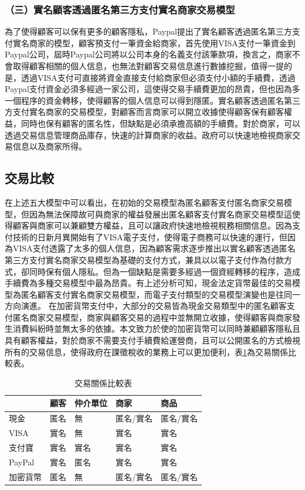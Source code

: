 		\subsubsection{（三）實名顧客透過匿名第三方支付實名商家交易模型}
		為了使得顧客可以保有更多的顧客隱私，Paypal提出了實名顧客透過匿名第三方支付實名商家的模型，顧客預支付一筆資金給商家，首先使用VISA支付一筆資金到Paypal公司，屆時Paypal公司將以公司本身的名義支付該筆款項，換言之，商家不會取得顧客相關的個人信息，也無法對顧客交易信息進行數據挖掘，值得一提的是，透過VISA支付可直接將資金直接支付給商家但必須支付小額的手續費，透過Paypal支付資金必須多經過一家公司，這使得交易手續費更加的昂貴，但也因為多一個程序的資金轉移，使得顧客的個人信息可以得到隱匿。實名顧客透過匿名第三方支付實名商家的交易模型，對顧客而言商家可以開立收據使得顧客保有顧客權益，同時也保有顧客的匿名性，但缺點是必須承擔高額的手續費。對於商家，可以透過交易信息管理商品庫存，快速的計算商家的收益。政府可以快速地檢視商家交易信息以及商家所得。

		\subsection{交易比較}
		在上述五大模型中可以看出，在初始的交易模型為匿名顧客支付匿名商家交易模型，但因為無法保障故可與商家的權益發展出匿名顧客支付實名商家交易模型這使得顧客與商家可以兼顧雙方權益，且可以讓政府快速地檢視稅務相關信息。因為支付技術的日新月異開始有了VISA電子支付，使得電子商務可以快速的運行，但因為VISA支付透露了太多的個人信息，因為顧客需求逐步推出以實名顧客透過匿名第三方支付實名商家交易模型為基礎的支付方式，兼具以以電子支付作為付款方式，卻同時保有個人隱私。但為一個缺點是需要多經過一個資經轉移的程序，造成手續費為多種交易模型中最為昂貴。有上述分析可知，現金法定貨幣最佳的交易模型為匿名顧客支付實名商家交易模型，而電子支付類型的交易模型演變也是往同一方向演進。
		在加密貨幣支付中，大部分的交易皆為現金交易類型中的匿名顧客支付匿名商家交易模型，商家與顧客交易的過程中並無開立收據，使得顧客與商家發生消費糾紛時並無太多的依據。本文致力於使的加密貨幣可以同時兼顧顧客隱私且具有顧客權益，對於商家不需要支付手續費給運營商，且可以公開匿名的方式檢視所有的交易信息，使得政府在課徵稅收的業務上可以更加便利，表\ref{txvs}為交易關係比較表。


		\begin{table}[!htbp]
		\centering
		\caption{交易關係比較表}
		\label{txvs}
		\begin{tabular}{|l|l|l|l|l|}
		\hline
		 & 顧客 & 仲介單位 & 商家 & 商品 \\ \hline
		現金 & 匿名 & 無 & 匿名/實名 & 匿名/實名 \\ \hline
		VISA & 實名 & 無 & 實名 & 實名 \\ \hline
		支付寶 & 實名 & 實名 & 實名 & 實名 \\ \hline
		PayPal & 實名 & 匿名 & 實名 & 實名 \\ \hline
		加密貨幣 & 匿名 & 無 & 匿名/實名 & 匿名/實名 \\ \hline
		\end{tabular}
		\end{table}

